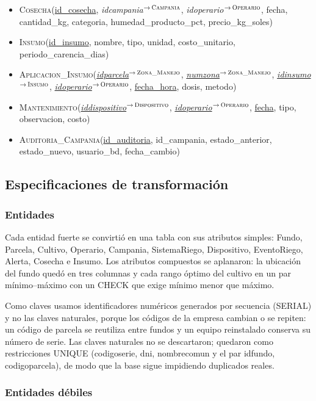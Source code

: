 \documentclass[11pt,letterpaper]{article}
\newcommand{\tbus}{\textunderscore\allowbreak}
\newcommand{\tb}[1]{{\ttfamily\let\_\tbus #1}}
\newcommand{\pk}[1]{\underline{#1}}
\newcommand{\fk}[2]{{\itshape\let\_\tbus #1}$^{\to\,\textsc{\let\_\tbus #2}}$}
\begin{document}
\begin{itemize}[leftmargin=1.2em,itemsep=0.3em]
\item \textsc{Cosecha}(\pk{id\_cosecha}, \fk{id\_campania}{Campania}, \fk{id\_operario}{Operario}, fecha, cantidad\_kg, categoria, humedad\_producto\_pct, precio\_kg\_soles)
\item \textsc{Insumo}(\pk{id\_insumo}, nombre, tipo, unidad, costo\_unitario, periodo\_carencia\_dias)
\item \textsc{Aplicacion\_Insumo}(\pk{\fk{id\_parcela}{Zona\_Manejo}}, \pk{\fk{num\_zona}{Zona\_Manejo}}, \pk{\fk{id\_insumo}{Insumo}}, \pk{\fk{id\_operario}{Operario}}, \pk{fecha\_hora}, dosis, metodo)
\item \textsc{Mantenimiento}(\pk{\fk{id\_dispositivo}{Dispositivo}}, \pk{\fk{id\_operario}{Operario}}, \pk{fecha}, tipo, observacion, costo)
\item \textsc{Auditoria\_Campania}(\pk{id\_auditoria}, id\_campania, estado\_anterior, estado\_nuevo, usuario\_bd, fecha\_cambio)
\end{itemize}

\subsection{Especificaciones de transformación}

\subsubsection{Entidades}

Cada entidad fuerte se convirtió en una tabla con sus atributos simples: \tb{Fundo}, \tb{Parcela}, \tb{Cultivo}, \tb{Operario}, \tb{Campania}, \tb{Sistema\_Riego}, \tb{Dispositivo}, \tb{Evento\_Riego}, \tb{Alerta}, \tb{Cosecha} e \tb{Insumo}. Los atributos compuestos se aplanaron: la ubicación del fundo quedó en tres columnas y cada rango óptimo del cultivo en un par mínimo--máximo con un \tb{CHECK} que exige mínimo menor que máximo.

Como claves usamos identificadores numéricos generados por secuencia (\tb{SERIAL}) y no las claves naturales, porque los códigos de la empresa cambian o se repiten: un código de parcela se reutiliza entre fundos y un equipo reinstalado conserva su número de serie. Las claves naturales no se descartaron; quedaron como restricciones \tb{UNIQUE} (\tb{codigo\_serie}, \tb{dni}, \tb{nombre\_comun} y el par \tb{id\_fundo}, \tb{codigo\_parcela}), de modo que la base sigue impidiendo duplicados reales.

\subsubsection{Entidades débiles}
\end{document}
